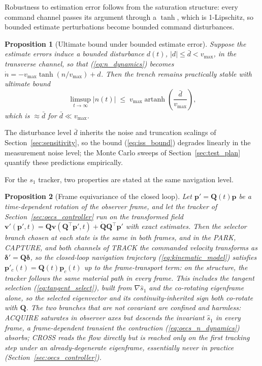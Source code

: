 \documentclass[lettersize,journal]{IEEEtran}
\newtheorem{proposition}{Proposition}
\begin{document}
Robustness to estimation error follows from the saturation structure:
every command channel passes its argument through a $\tanh$, which is
1-Lipschitz, so bounded estimate perturbations become bounded command
disturbances.

\begin{proposition}[Ultimate bound under bounded estimate error]
\label{prop:iss}
Suppose the estimate errors induce a bounded disturbance $d(t)$, $|d|
\leq \bar{d} < v_{\max}$, in the transverse channel, so that
(\ref{eq:n_dynamics}) becomes $\dot{n} = -v_{\max}\tanh(n/v_{\max}) +
d$. Then the trench remains practically stable with ultimate bound
\begin{equation}
    \limsup_{t\to\infty} |n(t)| \;\leq\;
    v_{\max}\operatorname{artanh}\!\left(\frac{\bar{d}}{v_{\max}}\right),
    \label{eq:iss_bound}
\end{equation}
which is $\approx \bar{d}$ for $\bar{d} \ll v_{\max}$.
\end{proposition}

The disturbance level $\bar{d}$ inherits the noise and truncation
scalings of Section~\ref{sec:sensitivity}, so the bound
(\ref{eq:iss_bound}) degrades linearly in the measurement noise level;
the Monte Carlo sweeps of Section~\ref{sec:test_plan} quantify these
predictions empirically.

For the $s_1$ tracker, two properties are stated at the same
navigation level.

\begin{proposition}[Frame equivariance of the closed loop]
\label{prop:equivariance}
Let $\mathbf{p}'= \mathbf{Q}(t)\mathbf{p}$ be a time-dependent rotation
of the observer frame, and let the tracker of
Section~\ref{sec:oecs_controller} run on the transformed field
$\mathbf{v}'(\mathbf{p}', t) = \mathbf{Q}\mathbf{v}(\mathbf{Q}^\top
\mathbf{p}', t) + \dot{\mathbf{Q}}\mathbf{Q}^\top\mathbf{p}'$ with
exact estimates. Then the selector branch chosen at each state is the
same in both frames, and in the PARK, CAPTURE, and both channels of
TRACK the commanded velocity transforms as
$\boldsymbol{\delta}' = \mathbf{Q}\boldsymbol{\delta}$, so the
closed-loop navigation trajectory (\ref{eq:kinematic_model}) satisfies
$\mathbf{p}'_c(t) = \mathbf{Q}(t)\mathbf{p}_c(t)$ up to the
frame-transport term: on the structure, the tracker follows the same
material path in every frame. This includes the tangent selection
(\ref{eq:tangent_select}), built from $\nabla\hat{s}_1$ and the
co-rotating eigenframe alone, so the selected eigenvector and its
continuity-inherited sign both co-rotate with $\mathbf{Q}$. The two
branches that are not covariant are confined and harmless: ACQUIRE
saturates in observer axes but descends the invariant $\hat{s}_1$ in
every frame, a frame-dependent transient the contraction
(\ref{eq:oecs_n_dynamics}) absorbs; CROSS reads the flow directly but is
reached only on the first tracking step under an already-degenerate
eigenframe, essentially never in practice
(Section~\ref{sec:oecs_controller}).
\end{proposition}
\end{document}
